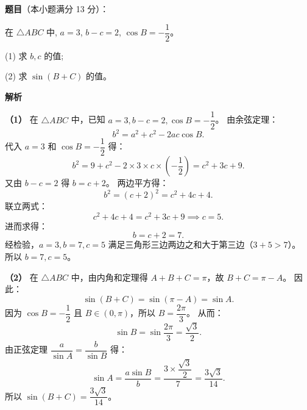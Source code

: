 \begin{answer}

\textbf{题目}（本小题满分 13 分）：

在 $\triangle ABC$ 中, $a = 3$, $b - c = 2$, $\cos B = -\dfrac{1}{2}$。

(1) 求 $b, c$ 的值;

(2) 求 $\sin(B + C)$ 的值。

\textbf{解析}

\textbf{（1）}
在 $\triangle ABC$ 中，已知 $a = 3, b - c = 2, \cos B = -\dfrac{1}{2}$。
由余弦定理：
\nopagebreak[4]
\[b^2 = a^2 + c^2 - 2ac \cos B.\]
代入 $a = 3$ 和 $\cos B = -\dfrac{1}{2}$ 得：
\nopagebreak[4]
\[b^2 = 9 + c^2 - 2 \times 3 \times c \times \left(-\dfrac{1}{2}\right) = c^2 + 3c + 9.\]
又由 $b - c = 2$ 得 $b = c + 2$。
两边平方得：
\nopagebreak[4]
\[b^2 = (c + 2)^2 = c^2 + 4c + 4.\]
联立两式：
\nopagebreak[4]
\[c^2 + 4c + 4 = c^2 + 3c + 9 \implies c = 5.\]
进而求得：
\nopagebreak[4]
\[b = c + 2 = 7.\]
经检验，$a = 3, b = 7, c = 5$ 满足三角形三边两边之和大于第三边（$3 + 5 > 7$）。
所以 $b = 7, c = 5$。

\textbf{（2）}
在 $\triangle ABC$ 中，由内角和定理得 $A + B + C = \pi$，故 $B + C = \pi - A$。
因此：
\nopagebreak[4]
\[\sin(B + C) = \sin(\pi - A) = \sin A.\]
因为 $\cos B = -\dfrac{1}{2}$ 且 $B \in (0, \pi)$，所以 $B = \dfrac{2\pi}{3}$。
从而：
\nopagebreak[4]
\[\sin B = \sin\dfrac{2\pi}{3} = \dfrac{\sqrt{3}}{2}.\]
由正弦定理 $\dfrac{a}{\sin A} = \dfrac{b}{\sin B}$ 得：
\nopagebreak[4]
\[\sin A = \dfrac{a \sin B}{b} = \dfrac{3 \times \dfrac{\sqrt{3}}{2}}{7} = \dfrac{3\sqrt{3}}{14}.\]
所以 $\sin(B + C) = \dfrac{3\sqrt{3}}{14}$。



\end{answer}
